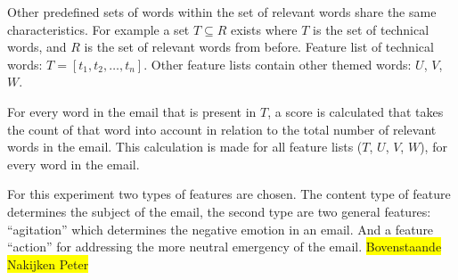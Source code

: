 \documentclass[journal]{IEEEtran}
\begin{document}
Other predefined sets of words within the set of relevant words share the 
    same characteristics. For example a set $T \subseteq R$ exists where $T$ 
    is the set of technical words, and $R$ is the set of relevant words from 
    before. Feature list of technical words: $T = [t_1, t_2, \dots, t_n]$. 
    Other feature lists contain other themed words: $U$, $V$, $W$.

    For every word in the email that is present in $T$, a score is calculated 
    that takes the count of that word into account in relation to the total 
    number of relevant words in the email. This calculation is made for all 
    feature lists ($T$, $U$, $V$, $W$), for every word in the email.

	For this experiment two types of features are chosen. 
	The content type of feature determines the subject of the email, the second type are two general features: ``agitation'' which determines the negative emotion in an email. And a feature ``action'' for addressing the more neutral emergency of the email.
	\colorbox{yellow}{Bovenstaande Nakijken Peter}


%
%    
%    
%    
%    
%    
\end{document}
